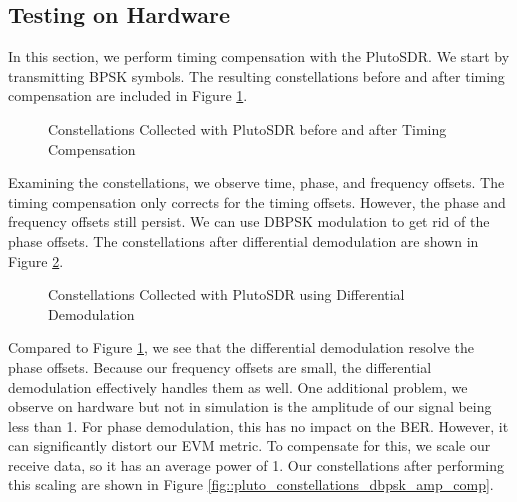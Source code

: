 \documentclass{article}
\begin{document}
\subsection{Testing on Hardware}

In this section, we perform timing compensation with the PlutoSDR. We start by transmitting BPSK symbols. The resulting constellations before and after timing compensation are included in Figure \ref{fig::pluto_constellations_no_comp}.

\begin{figure}[H]
	\centerline{}
	\caption{Constellations Collected with PlutoSDR before and after Timing Compensation}
	\label{fig::pluto_constellations_no_comp}
\end{figure}

\noindent Examining the constellations, we observe time, phase, and frequency offsets. The timing compensation only corrects for the timing offsets. However, the phase and frequency offsets still persist. We can use DBPSK modulation to get rid of the phase offsets. The constellations after differential demodulation are shown in Figure \ref{fig::pluto_constellations_dbpsk}.

\begin{figure}[H]
	\centerline{}
	\caption{Constellations Collected with PlutoSDR using Differential Demodulation}
	\label{fig::pluto_constellations_dbpsk}
\end{figure}

\noindent Compared to Figure \ref{fig::pluto_constellations_no_comp}, we see that the differential demodulation resolve the phase offsets. Because our frequency offsets are small, the differential demodulation effectively handles them as well. One additional problem, we observe on hardware but not in simulation is the amplitude of our signal being less than 1. For phase demodulation, this has no impact on the BER. However, it can significantly distort our EVM metric. To compensate for this, we scale our receive data, so it has an average power of 1. Our constellations after performing this scaling are shown in Figure \ref{fig::pluto_constellations_dbpsk_amp_comp}.
\end{document}
